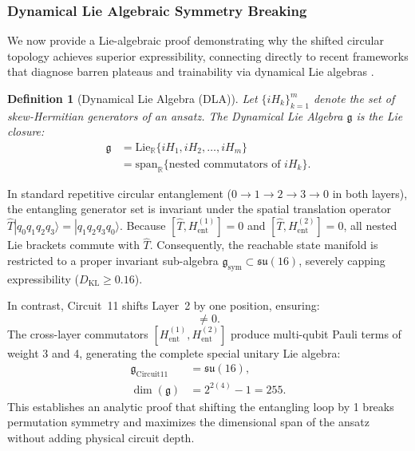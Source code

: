 \documentclass[journal]{IEEEtran}
\newtheorem{definition}{Definition}
\begin{document}
\subsubsection{Dynamical Lie Algebraic Symmetry Breaking}
We now provide a Lie-algebraic proof demonstrating why the shifted circular topology achieves superior expressibility, connecting directly to recent frameworks that diagnose barren plateaus and trainability via dynamical Lie algebras \cite{larocca2022diagnosing}.

\begin{definition}[Dynamical Lie Algebra (DLA)]
Let $\{i H_k\}_{k=1}^m$ denote the set of skew-Hermitian generators of an ansatz. The Dynamical Lie Algebra $\mathfrak{g}$ is the Lie closure:
\begin{align}
\mathfrak{g} &= \mathrm{Lie}_{\mathbb{R}}\{i H_1, i H_2, \dots, i H_m\} \nonumber \\
&= \mathrm{span}_{\mathbb{R}}\{ \text{nested commutators of } i H_k \}.
\label{eq:dla_definition}
\end{align}
\end{definition}

In standard repetitive circular entanglement ($0 \to 1 \to 2 \to 3 \to 0$ in both layers), the entangling generator set is invariant under the spatial translation operator $\hat{T}|q_0 q_1 q_2 q_3\rangle = |q_1 q_2 q_3 q_0\rangle$. Because $[\hat{T}, H_{\mathrm{ent}}^{(1)}] = 0$ and $[\hat{T}, H_{\mathrm{ent}}^{(2)}] = 0$, all nested Lie brackets commute with $\hat{T}$. Consequently, the reachable state manifold is restricted to a proper invariant sub-algebra $\mathfrak{g}_{\mathrm{sym}} \subset \mathfrak{su}(16)$, severely capping expressibility ($D_{\mathrm{KL}} \ge 0.16$).

In contrast, Circuit~11 shifts Layer~2 by one position, ensuring:
\begin{equation}
[\hat{T}, H_{\mathrm{ent}}^{(2)}] \neq 0.
\label{eq:translation_breaking}
\end{equation}
The cross-layer commutators $[H_{\mathrm{ent}}^{(1)}, H_{\mathrm{ent}}^{(2)}]$ produce multi-qubit Pauli terms of weight 3 and 4, generating the complete special unitary Lie algebra:
\begin{align}
\mathfrak{g}_{\mathrm{Circuit11}} &= \mathfrak{su}(16), \nonumber \\
\dim(\mathfrak{g}) &= 2^{2(4)} - 1 = 255.
\label{eq:full_algebra}
\end{align}
This establishes an analytic proof that shifting the entangling loop by 1 breaks permutation symmetry and maximizes the dimensional span of the ansatz without adding physical circuit depth.
\end{document}
